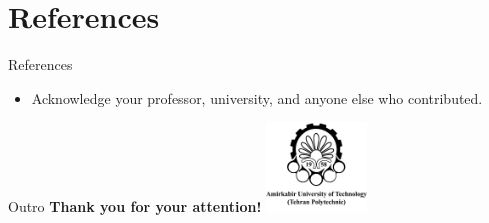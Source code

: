 \documentclass{beamer}
\begin{document}
\section{References}
\begin{frame}{References}
    \begin{itemize}
        \item Acknowledge your professor, university, and anyone else who contributed.
    \end{itemize}
\end{frame}

\begin{frame}{Outro}
    \centering
    {\Large \textbf{Thank you for your attention!}} \vspace{1cm} %
    \vfill %
    \includegraphics[width=0.2\textwidth]{amirkabir.png} %
\end{frame}
\end{document}

